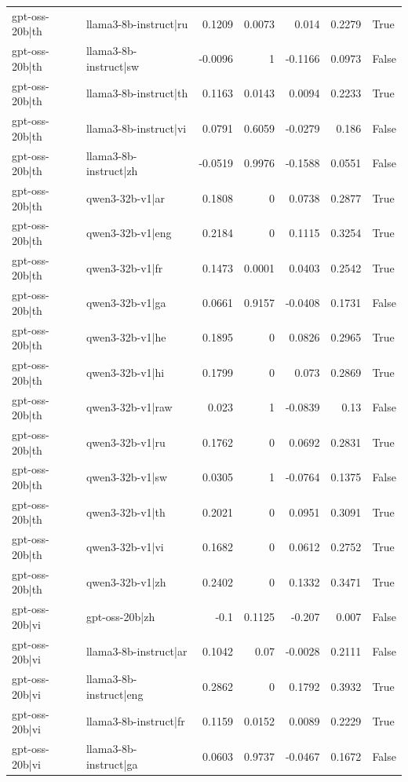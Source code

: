 \begin{table}
\begin{tabular}{l l r r r r l}
gpt-oss-20b|th & llama3-8b-instruct|ru & 0.1209 & 0.0073 & 0.014 & 0.2279 & True \\
gpt-oss-20b|th & llama3-8b-instruct|sw & -0.0096 & 1 & -0.1166 & 0.0973 & False \\
gpt-oss-20b|th & llama3-8b-instruct|th & 0.1163 & 0.0143 & 0.0094 & 0.2233 & True \\
gpt-oss-20b|th & llama3-8b-instruct|vi & 0.0791 & 0.6059 & -0.0279 & 0.186 & False \\
gpt-oss-20b|th & llama3-8b-instruct|zh & -0.0519 & 0.9976 & -0.1588 & 0.0551 & False \\
gpt-oss-20b|th & qwen3-32b-v1|ar & 0.1808 & 0 & 0.0738 & 0.2877 & True \\
gpt-oss-20b|th & qwen3-32b-v1|eng & 0.2184 & 0 & 0.1115 & 0.3254 & True \\
gpt-oss-20b|th & qwen3-32b-v1|fr & 0.1473 & 0.0001 & 0.0403 & 0.2542 & True \\
gpt-oss-20b|th & qwen3-32b-v1|ga & 0.0661 & 0.9157 & -0.0408 & 0.1731 & False \\
gpt-oss-20b|th & qwen3-32b-v1|he & 0.1895 & 0 & 0.0826 & 0.2965 & True \\
gpt-oss-20b|th & qwen3-32b-v1|hi & 0.1799 & 0 & 0.073 & 0.2869 & True \\
gpt-oss-20b|th & qwen3-32b-v1|raw & 0.023 & 1 & -0.0839 & 0.13 & False \\
gpt-oss-20b|th & qwen3-32b-v1|ru & 0.1762 & 0 & 0.0692 & 0.2831 & True \\
gpt-oss-20b|th & qwen3-32b-v1|sw & 0.0305 & 1 & -0.0764 & 0.1375 & False \\
gpt-oss-20b|th & qwen3-32b-v1|th & 0.2021 & 0 & 0.0951 & 0.3091 & True \\
gpt-oss-20b|th & qwen3-32b-v1|vi & 0.1682 & 0 & 0.0612 & 0.2752 & True \\
gpt-oss-20b|th & qwen3-32b-v1|zh & 0.2402 & 0 & 0.1332 & 0.3471 & True \\
gpt-oss-20b|vi & gpt-oss-20b|zh & -0.1 & 0.1125 & -0.207 & 0.007 & False \\
gpt-oss-20b|vi & llama3-8b-instruct|ar & 0.1042 & 0.07 & -0.0028 & 0.2111 & False \\
gpt-oss-20b|vi & llama3-8b-instruct|eng & 0.2862 & 0 & 0.1792 & 0.3932 & True \\
gpt-oss-20b|vi & llama3-8b-instruct|fr & 0.1159 & 0.0152 & 0.0089 & 0.2229 & True \\
gpt-oss-20b|vi & llama3-8b-instruct|ga & 0.0603 & 0.9737 & -0.0467 & 0.1672 & False \\

\end{tabular}
\end{table}
